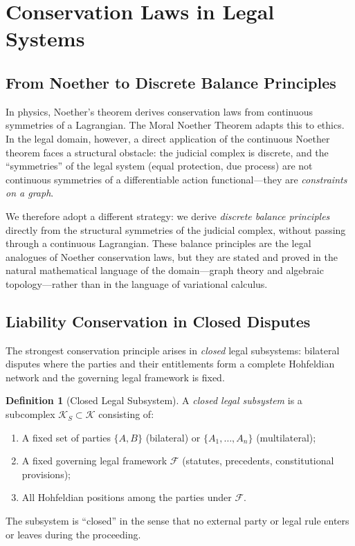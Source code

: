 \documentclass[12pt]{article}
\theoremstyle{definition}
\newtheorem{definition}[theorem]{Definition}
\theoremstyle{remark}
\begin{document}
\section{Conservation Laws in Legal Systems}
\label{sec:noether}

\subsection{From Noether to Discrete Balance Principles}

In physics, Noether's theorem \cite{noether1918} derives conservation laws from continuous symmetries of a Lagrangian.  The Moral Noether Theorem \cite{bond2026noether} adapts this to ethics.  In the legal domain, however, a direct application of the continuous Noether theorem faces a structural obstacle: the judicial complex is discrete, and the ``symmetries'' of the legal system (equal protection, due process) are not continuous symmetries of a differentiable action functional---they are \emph{constraints on a graph}.

We therefore adopt a different strategy: we derive \emph{discrete balance principles} directly from the structural symmetries of the judicial complex, without passing through a continuous Lagrangian.  These balance principles are the legal analogues of Noether conservation laws, but they are stated and proved in the natural mathematical language of the domain---graph theory and algebraic topology---rather than in the language of variational calculus.

\subsection{Liability Conservation in Closed Disputes}

The strongest conservation principle arises in \emph{closed} legal subsystems: bilateral disputes where the parties and their entitlements form a complete Hohfeldian network and the governing legal framework is fixed.

\begin{definition}[Closed Legal Subsystem]
\label{def:closed}
A \emph{closed legal subsystem} is a subcomplex $\mathcal{K}_S \subset \mathcal{K}$ consisting of:
\begin{enumerate}
    \item A fixed set of parties $\{A, B\}$ (bilateral) or $\{A_1, \ldots, A_n\}$ (multilateral);
    \item A fixed governing legal framework $\mathcal{F}$ (statutes, precedents, constitutional provisions);
    \item All Hohfeldian positions among the parties under $\mathcal{F}$.
\end{enumerate}
The subsystem is ``closed'' in the sense that no external party or legal rule enters or leaves during the proceeding.
\end{definition}
\end{document}
